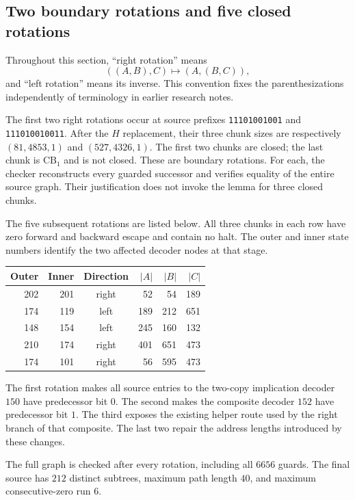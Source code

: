\subsection{Two boundary rotations and five closed rotations}

Throughout this section, ``right rotation'' means
\[
 ((A,B),C)\longmapsto(A,(B,C)),
\]
and ``left rotation'' means its inverse.  This convention fixes the
parenthesizations independently of terminology in earlier research notes.

The first two right rotations occur at source prefixes
\texttt{11101001001} and \texttt{111010010011}.
After the $H$ replacement, their three chunk sizes are respectively
$(81,4853,1)$ and $(527,4326,1)$.  The first two chunks are closed;
the last chunk is $\mathrm{CB}_1$ and is not closed.  These are boundary
rotations.  For each, the checker reconstructs every guarded successor
and verifies equality of the entire source graph.  Their justification
does not invoke the lemma for three closed chunks.

The five subsequent rotations are listed below.  All three chunks in
each row have zero forward and backward escape and contain no halt.
The outer and inner state numbers identify the two affected decoder
nodes at that stage.

\begin{center}
\begin{tabular}{r r c r r r}
Outer & Inner & Direction & $|A|$ & $|B|$ & $|C|$\\
\hline
202 & 201 & right & 52 & 54 & 189\\
174 & 119 & left  & 189 & 212 & 651\\
148 & 154 & left  & 245 & 160 & 132\\
210 & 174 & right & 401 & 651 & 473\\
174 & 101 & right & 56 & 595 & 473
\end{tabular}
\end{center}

The first rotation makes all source entries to the two-copy implication
decoder $150$ have predecessor bit $0$.  The second makes the composite
decoder $152$ have predecessor bit $1$.  The third exposes the existing
helper route used by the right branch of that composite.  The last two
repair the address lengths introduced by these changes.

The full graph is checked after every rotation, including all $6656$
guards.  The final source has $212$ distinct subtrees, maximum path
length $40$, and maximum consecutive-zero run $6$.

